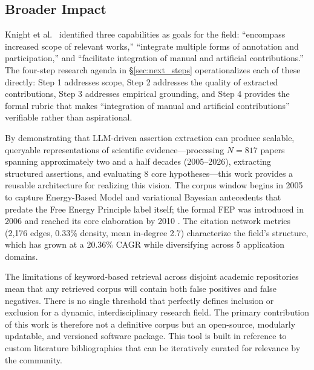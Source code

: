 \documentclass[
  english,
]{article}
\begin{document}
{{{{{{{{{{{{{{{{\subsection{Broader Impact}\label{broader-impact}

Knight et al.~\citep{knight2022fep} identified three capabilities as
goals for the field: ``encompass increased scope of relevant works,''
``integrate multiple forms of annotation and participation,'' and
``facilitate integration of manual and artificial contributions.'' The
four-step research agenda in §\ref{sec:next_steps} operationalizes each
of these directly: Step 1 addresses scope, Step 2 addresses the quality
of extracted contributions, Step 3 addresses empirical grounding, and
Step 4 provides the formal rubric that makes ``integration of manual and
artificial contributions'' verifiable rather than aspirational.

By demonstrating that LLM-driven assertion extraction can produce
scalable, queryable representations of scientific evidence---processing
\(N = 817\) papers spanning approximately two and a half decades
(2005--2026), extracting structured assertions, and evaluating 8 core
hypotheses---this work provides a reusable architecture for realizing
this vision. The corpus window begins in 2005 to capture Energy-Based
Model and variational Bayesian antecedents that predate the Free Energy
Principle label itself; the formal FEP was introduced in 2006
\citep{friston2006free} and reached its core elaboration by 2010
\citep{friston2010free}. The citation network metrics (2,176 edges,
0.33\% density, mean in-degree 2.7) characterize the field's structure,
which has grown at a 20.36\% CAGR while diversifying across 5
application domains.

The limitations of keyword-based retrieval across disjoint academic
repositories mean that any retrieved corpus will contain both false
positives and false negatives. There is no single threshold that
perfectly defines inclusion or exclusion for a dynamic,
interdisciplinary research field. The primary contribution of this work
is therefore not a definitive corpus but an open-source, modularly
updatable, and versioned software package. This tool is built in
reference to custom literature bibliographies that can be iteratively
curated for relevance by the community.

}}}}}}}}}}}}}}}}
\end{document}
